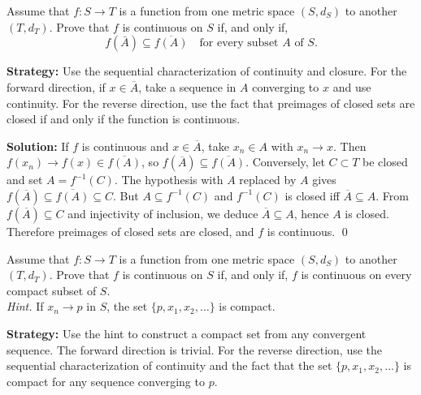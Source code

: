 \begin{problembox}
\begin{problemstatement}
Assume that $f : S \rightarrow T$ is a function from one metric space $(S, d_S)$ to another $(T, d_T)$. Prove that $f$ is continuous on $S$ if, and only if,
\[ f(\bar{A}) \subseteq \overline{f(A)} \quad \text{for every subset } A \text{ of } S. \]
\end{problemstatement}
\end{problembox}

\noindent\textbf{Strategy:} Use the sequential characterization of continuity and closure. For the forward direction, if $x \in \overline{A}$, take a sequence in $A$ converging to $x$ and use continuity. For the reverse direction, use the fact that preimages of closed sets are closed if and only if the function is continuous.

\bigskip\noindent\textbf{Solution:}
If $f$ is continuous and $x\in\overline{A}$, take $x_n\in A$ with $x_n\to x$. Then $f(x_n)\to f(x)\in\overline{f(A)}$, so $f(\overline{A})\subseteq\overline{f(A)}$. Conversely, let $C\subset T$ be closed and set $A=f^{-1}(C)$. The hypothesis with $A$ replaced by $A$ gives $f(\overline{A})\subseteq\overline{f(A)}\subseteq C$. But $A\subseteq f^{-1}(C)$ and $f^{-1}(C)$ is closed iff $\overline{A}\subseteq A$. From $f(\overline{A})\subseteq C$ and injectivity of inclusion, we deduce $\overline{A}\subseteq A$, hence $A$ is closed. Therefore preimages of closed sets are closed, and $f$ is continuous. \qed



\begin{problembox}
\begin{problemstatement}
Assume that $f : S \rightarrow T$ is a function from one metric space $(S, d_S)$ to another $(T, d_T)$. Prove that $f$ is continuous on $S$ if, and only if, $f$ is continuous on every compact subset of $S$. \\
\textit{Hint.} If $x_n \rightarrow p$ in $S$, the set $\{p, x_1, x_2, \ldots\}$ is compact.
\end{problemstatement}
\end{problembox}

\noindent\textbf{Strategy:} Use the hint to construct a compact set from any convergent sequence. The forward direction is trivial. For the reverse direction, use the sequential characterization of continuity and the fact that the set $\{p, x_1, x_2, \ldots\}$ is compact for any sequence converging to $p$.

